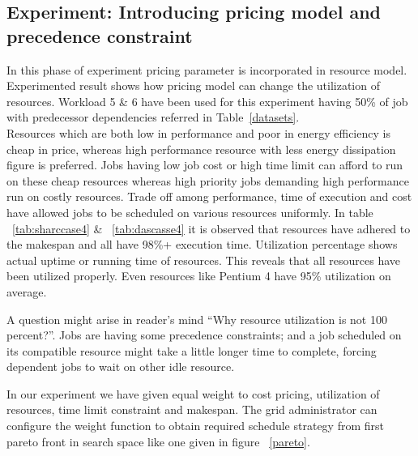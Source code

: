 \subsection{Experiment: Introducing pricing model and precedence constraint}
\label{case4}
In this phase of experiment pricing parameter is incorporated in resource model. Experimented result shows how pricing model can change the utilization of resources. Workload 5 \&  6 have been used for this experiment having 50\% of job with predecessor dependencies referred in Table~\ref{datasets}. \\
Resources which are both low in performance and poor in energy efficiency is cheap in price, whereas high performance resource with less energy dissipation figure is preferred. Jobs having low job cost or high time limit can afford to run on these cheap resources whereas high priority jobs demanding high performance run on costly resources. Trade off among performance, time of execution and cost have allowed jobs to be scheduled on various resources uniformly. In table ~\ref{tab:sharccase4} \& ~\ref{tab:dascasse4}  it is observed that resources have adhered to the makespan and all have 98\%+ execution time. Utilization percentage shows actual uptime or running time of resources. This reveals that all resources have been utilized properly. Even resources like Pentium 4 have 95\% utilization on average.
\begin{framed}
{\small A question might arise in reader's mind ``Why resource utilization is not 100 percent?''. Jobs are having some precedence constraints; and a job scheduled on its compatible resource might take a little longer time to complete, forcing dependent jobs to wait on other idle resource. }
\end{framed}
In our experiment we have given equal weight to cost pricing, utilization of resources, time limit constraint and makespan. The grid administrator can configure the weight function to obtain required schedule strategy from first pareto front in search space like one given in figure ~\ref{pareto}.

